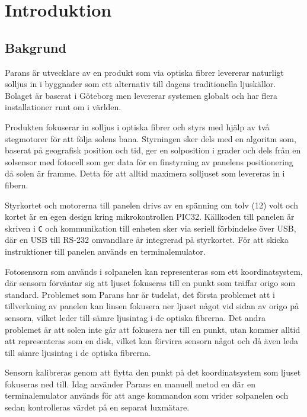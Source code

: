 \section{Introduktion} %
\label{sec:indroduktion}

    \subsection{Bakgrund} %
    \label{sub:bakgrund}
        Parans är utvecklare av en produkt som via optiska fibrer levererar naturligt solljus in i byggnader som ett alternativ till dagens traditionella ljuskällor. 
        Bolaget är baserat i Göteborg men levererar systemen globalt och har flera installationer runt om i världen. \bigskip

        Produkten fokuserar in solljus i optiska fibrer och styrs med hjälp av två stegmotorer för att följa solens bana. 
        Styrningen sker dels med en algoritm som, baserat på geografisk position och tid, ger en solposition i grader och dels från en solsensor med fotocell som ger data för en finstyrning av panelens positionering då solen är framme.
        Detta för att alltid maximera solljuset som levereras in i fibern.\bigskip

        Styrkortet och motorerna till panelen drivs av en spänning om tolv (12) volt och kortet är en egen design kring mikrokontrollen PIC32. 
        Källkoden till panelen är skriven i \texttt{C} och kommunikation till enheten sker via seriell förbindelse över USB, där en USB till RS-232 omvandlare är integrerad på styrkortet. För att skicka instruktioner till panelen används en terminalemulator. \bigskip

        Fotosensorn som används i solpanelen kan representeras som ett koordinatsystem, där sensorn förväntar sig att ljuset fokuseras till en punkt som träffar origo som standard. 
        Problemet som Parans har är tudelat, det första problemet att i tillverkning av panelen kan linsen fokusera ner ljuset något vid sidan av origo på sensorn, vilket leder till sämre ljusintag i de optiska fibrerna. 
        Det andra problemet är att solen inte går att fokusera ner till en punkt, utan kommer alltid att representeras som en disk, vilket kan förvirra sensorn något och då även leda till sämre ljusintag i de optiska fibrerna. \bigskip

        

        Sensorn kalibreras genom att flytta den punkt på det koordinatsystem som ljuset fokuseras ned till. Idag använder Parans en manuell metod en där en terminalemulator används för att ange kommandon som vrider solpanelen och sedan kontrolleras värdet på en separat luxmätare.

